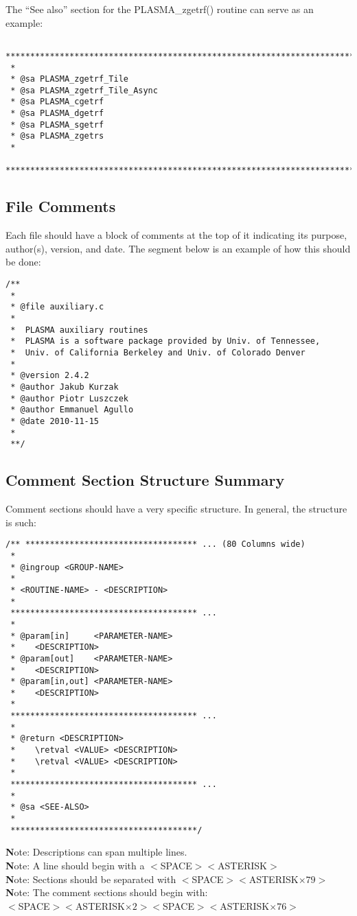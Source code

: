 The ``See also'' section for the PLASMA\_zgetrf() routine can serve as an example:
\begin{verbatim}
 *******************************************************************************
 *
 * @sa PLASMA_zgetrf_Tile
 * @sa PLASMA_zgetrf_Tile_Async
 * @sa PLASMA_cgetrf
 * @sa PLASMA_dgetrf
 * @sa PLASMA_sgetrf
 * @sa PLASMA_zgetrs
 *
 ******************************************************************************/
\end{verbatim}

\subsection{File Comments}
Each file should have a block of comments at the top of it indicating its purpose, author(s), version, and date.  The segment below is an example of how this should be done:
\begin{verbatim}
/**
 *
 * @file auxiliary.c
 *
 *  PLASMA auxiliary routines
 *  PLASMA is a software package provided by Univ. of Tennessee,
 *  Univ. of California Berkeley and Univ. of Colorado Denver
 *
 * @version 2.4.2
 * @author Jakub Kurzak
 * @author Piotr Luszczek
 * @author Emmanuel Agullo
 * @date 2010-11-15
 *
 **/
\end{verbatim}

\pagebreak
\subsection{Comment Section Structure Summary}
\label{comments:summary}
Comment sections should have a very specific structure. In general, the structure is such:
\begin{verbatim}
/** *********************************** ... (80 Columns wide)
 *
 * @ingroup <GROUP-NAME>
 *
 * <ROUTINE-NAME> - <DESCRIPTION>
 *
 ************************************** ...
 *
 * @param[in]     <PARAMETER-NAME>
 *    <DESCRIPTION>
 * @param[out]    <PARAMETER-NAME>
 *    <DESCRIPTION>
 * @param[in,out] <PARAMETER-NAME>
 *    <DESCRIPTION>
 *
 ************************************** ...
 *
 * @return <DESCRIPTION>
 *    \retval <VALUE> <DESCRIPTION>
 *    \retval <VALUE> <DESCRIPTION>     
 *
 ************************************** ...
 *
 * @sa <SEE-ALSO>
 *
 **************************************/
\end{verbatim}

{\textbf Note:} Descriptions can span multiple lines. \\
{\textbf Note:} A line should begin with a $<$SPACE$><$ASTERISK$>$ \\
{\textbf Note:} Sections should be separated with $<$SPACE$><$ASTERISK$\times 79>$ \\
{\textbf Note:} The comment sections should begin with: \\
$<$SPACE$><$ASTERISK$\times 2><$SPACE$><$ASTERISK$\times 76>$

